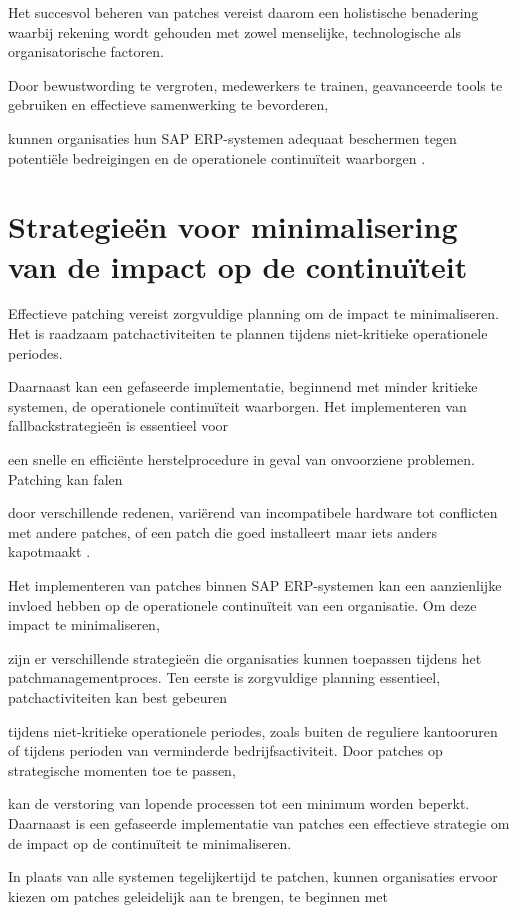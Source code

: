 Het succesvol beheren van patches vereist daarom een holistische benadering waarbij rekening wordt gehouden met zowel menselijke, technologische als organisatorische factoren.

Door bewustwording te vergroten, medewerkers te trainen, geavanceerde tools te gebruiken en effectieve samenwerking te bevorderen, 

kunnen organisaties hun SAP ERP-systemen adequaat beschermen tegen potentiële bedreigingen en de operationele continuïteit waarborgen \autocite{Graffeo2018}.

\section{Strategieën voor minimalisering van de impact op de continuïteit}
Effectieve patching vereist zorgvuldige planning om de impact te minimaliseren. Het is raadzaam patchactiviteiten te plannen tijdens niet-kritieke operationele periodes.

Daarnaast kan een gefaseerde implementatie, beginnend met minder kritieke systemen, de operationele continuïteit waarborgen. Het implementeren van fallbackstrategieën is essentieel voor 

een snelle en efficiënte herstelprocedure in geval van onvoorziene problemen. Patching kan falen

door verschillende redenen, variërend van incompatibele hardware tot conflicten met andere patches, of een patch die goed installeert maar iets anders kapotmaakt \autocite{Shein2022}.

Het implementeren van patches binnen SAP ERP-systemen kan een aanzienlijke invloed hebben op de operationele continuïteit van een organisatie. Om deze impact te minimaliseren,

zijn er verschillende strategieën die organisaties kunnen toepassen tijdens het patchmanagementproces. Ten eerste is zorgvuldige planning essentieel, patchactiviteiten kan best gebeuren

tijdens niet-kritieke operationele periodes, zoals buiten de reguliere kantooruren of tijdens perioden van verminderde bedrijfsactiviteit. Door patches op strategische momenten toe te passen,

kan de verstoring van lopende processen tot een minimum worden beperkt. Daarnaast is een gefaseerde implementatie van patches een effectieve strategie om de impact op de continuïteit te minimaliseren. 

In plaats van alle systemen tegelijkertijd te patchen, kunnen organisaties ervoor kiezen om patches geleidelijk aan te brengen, te beginnen met


